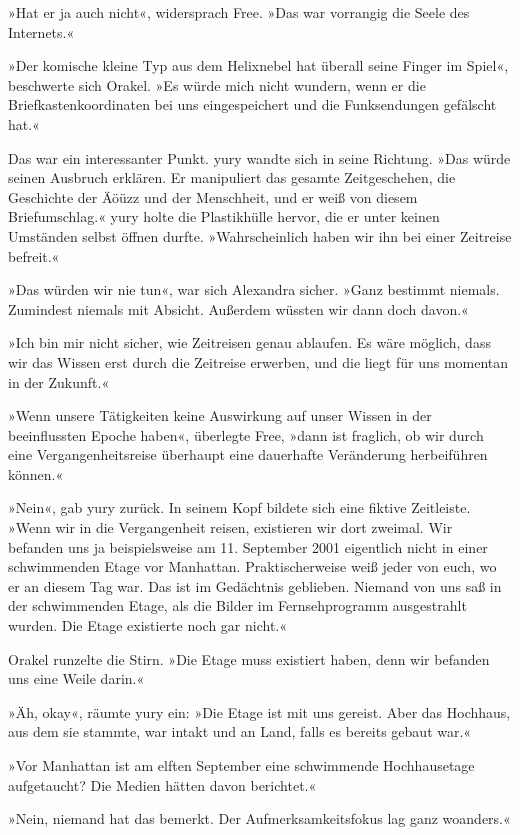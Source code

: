 »Hat er ja auch nicht«, widersprach Free. »Das war vorrangig die Seele des Internets.«

»Der komische kleine Typ aus dem Helixnebel hat überall seine Finger im Spiel«, beschwerte sich Orakel. »Es würde mich nicht wundern, wenn er die Briefkastenkoordinaten bei uns eingespeichert und die Funksendungen gefälscht hat.«

Das war ein interessanter Punkt. yury wandte sich in seine Richtung. »Das würde seinen Ausbruch erklären. Er manipuliert das gesamte Zeitgeschehen, die Geschichte der Äöüzz und der Menschheit, und er weiß von diesem Briefumschlag.« yury holte die Plastikhülle hervor, die er unter keinen Umständen selbst öffnen durfte. »Wahrscheinlich haben wir ihn bei einer Zeitreise befreit.«

»Das würden wir nie tun«, war sich Alexandra sicher. »Ganz bestimmt niemals. Zumindest niemals mit Absicht. Außerdem wüssten wir dann doch davon.«

»Ich bin mir nicht sicher, wie Zeitreisen genau ablaufen. Es wäre möglich, dass wir das Wissen erst durch die Zeitreise erwerben, und die liegt für uns momentan in der Zukunft.«

»Wenn unsere Tätigkeiten keine Auswirkung auf unser Wissen in der beeinflussten Epoche haben«, überlegte Free, »dann ist fraglich, ob wir durch eine Vergangenheitsreise überhaupt eine dauerhafte Veränderung herbeiführen können.«

»Nein«, gab yury zurück. In seinem Kopf bildete sich eine fiktive Zeitleiste. »Wenn wir in die Vergangenheit reisen, existieren wir dort zweimal. Wir befanden uns ja beispielsweise am 11. September 2001 eigentlich nicht in einer schwimmenden Etage vor Manhattan. Praktischerweise weiß jeder von euch, wo er an diesem Tag war. Das ist im Gedächtnis geblieben. Niemand von uns saß in der schwimmenden Etage, als die Bilder im Fernsehprogramm ausgestrahlt wurden. Die Etage existierte noch gar nicht.«

Orakel runzelte die Stirn. »Die Etage muss existiert haben, denn wir befanden uns eine Weile darin.«

»Äh, okay«, räumte yury ein: »Die Etage ist mit uns gereist. Aber das Hochhaus, aus dem sie stammte, war intakt und an Land, falls es bereits gebaut war.«

»Vor Manhattan ist am elften September eine schwimmende Hochhausetage aufgetaucht? Die Medien hätten davon berichtet.«

»Nein, niemand hat das bemerkt. Der Aufmerksamkeitsfokus lag ganz woanders.«

